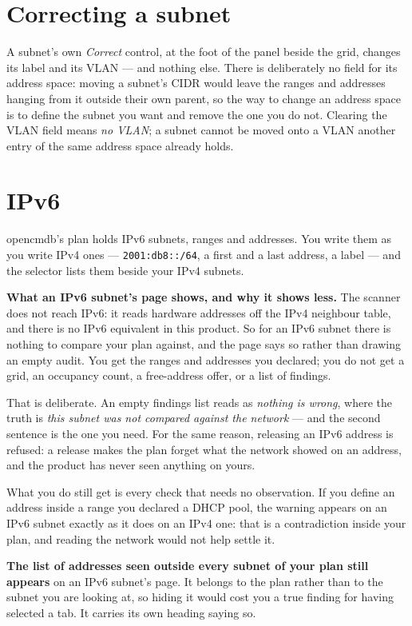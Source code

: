 \documentclass[11pt,oneside,listof=totoc,bibliography=totoc]{scrreprt}
\begin{document}
\section{Correcting a subnet}
A subnet's own \emph{Correct} control, at the foot of the panel beside the grid, changes its label
and its VLAN --- and nothing else. There is deliberately no field for its address space: moving a
subnet's CIDR would leave the ranges and addresses hanging from it outside their own parent, so the
way to change an address space is to define the subnet you want and remove the one you do not.
Clearing the VLAN field means \emph{no VLAN}; a subnet cannot be moved onto a VLAN another entry of
the same address space already holds.

\section{IPv6}
opencmdb's plan holds IPv6 subnets, ranges and addresses. You write them as you write IPv4 ones ---
\texttt{2001:db8::/64}, a first and a last address, a label --- and the selector lists them beside
your IPv4 subnets.

\textbf{What an IPv6 subnet's page shows, and why it shows less.} The scanner does not reach IPv6:
it reads hardware addresses off the IPv4 neighbour table, and there is no IPv6 equivalent in this
product. So for an IPv6 subnet there is nothing to compare your plan against, and the page says so
rather than drawing an empty audit. You get the ranges and addresses you declared; you do not get a
grid, an occupancy count, a free-address offer, or a list of findings.

That is deliberate. An empty findings list reads as \emph{nothing is wrong}, where the truth is
\emph{this subnet was not compared against the network} --- and the second sentence is the one you
need. For the same reason, releasing an IPv6 address is refused: a release makes the plan forget what
the network showed on an address, and the product has never seen anything on yours.

What you do still get is every check that needs no observation. If you define an address inside a
range you declared a DHCP pool, the warning appears on an IPv6 subnet exactly as it does on an IPv4
one: that is a contradiction inside your plan, and reading the network would not help settle it.

\textbf{The list of addresses seen outside every subnet of your plan still appears} on an IPv6
subnet's page. It belongs to the plan rather than to the subnet you are looking at, so hiding it
would cost you a true finding for having selected a tab. It carries its own heading saying so.
\end{document}
